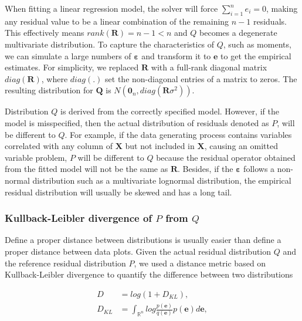 \documentclass[]{interact}
\theoremstyle{plain}%
\theoremstyle{definition}
\theoremstyle{remark}
\begin{document}
When fitting a linear regression model, the solver will force
\(\sum_{i=1}^{n} e_i = 0\), making any residual value to be a linear
combination of the remaining \(n - 1\) residuals. This effectively means
\(rank(\boldsymbol{R}) = n - 1 < n\) and \(Q\) becomes a degenerate
multivariate distribution. To capture the characteristics of \(Q\), such
as moments, we can simulate a large numbers of
\(\boldsymbol{\varepsilon}\) and transform it to \(\boldsymbol{e}\) to
get the empirical estimates. For simplicity, we replaced
\(\boldsymbol{R}\) with a full-rank diagonal matrix
\(diag(\boldsymbol{R})\), where \(diag(.)\) set the non-diagonal entries
of a matrix to zeros. The resulting distribution for \(\boldsymbol{Q}\)
is \(N(\boldsymbol{0}_n, diag(\boldsymbol{R}\sigma^2))\).

Distribution \(Q\) is derived from the correctly specified model.
However, if the model is misspecified, then the actual distribution of
residuals denoted as \(P\), will be different to \(Q\). For example, if
the data generating process contains variables correlated with any
column of \(\boldsymbol{X}\) but not included in \(\boldsymbol{X}\),
causing an omitted variable problem, \(P\) will be different to \(Q\)
because the residual operator obtained from the fitted model will not be
the same as \(\boldsymbol{R}\). Besides, if the
\(\boldsymbol{\varepsilon}\) follows a non-normal distribution such as a
multivariate lognormal distribution, the empirical residual distribution
will usually be skewed and has a long tail.

\hypertarget{kullback-leibler-divergence-of-p-from-q}{%
\subsubsection{\texorpdfstring{Kullback-Leibler divergence of \(P\) from
\(Q\)}{Kullback-Leibler divergence of P from Q}}\label{kullback-leibler-divergence-of-p-from-q}}

Define a proper distance between distributions is usually easier than
define a proper distance between data plots. Given the actual residual
distribution \(Q\) and the reference residual distribution \(P\), we
used a distance metric based on Kullback-Leibler divergence
\citep{kullback1951information} to quantify the difference between two
distributions

\begin{align}
\label{eq:kl-0}
D &= log\left(1 + D_{KL}\right), \\
\label{eq:kl-1}
D_{KL} &= \int_{\mathbb{R}^{n}}log\frac{p(\boldsymbol{e})}{q(\boldsymbol{e})}p(\boldsymbol{e})d\boldsymbol{e},
\end{align}
\end{document}
